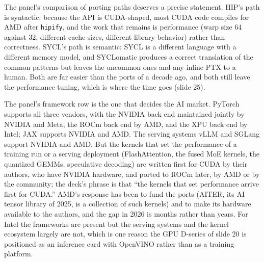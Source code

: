 \documentclass[11pt,letterpaper]{article}
\begin{document}
The panel's comparison of porting paths deserves a precise statement. HIP's path is syntactic: because the API is CUDA-shaped, most CUDA code compiles for AMD after \texttt{hipify}, and the work that remains is performance (warp size 64 against 32, different cache sizes, different library behavior) rather than correctness. SYCL's path is semantic: SYCL is a different language with a different memory model, and SYCLomatic produces a correct translation of the common patterns but leaves the uncommon ones and any inline PTX to a human. Both are far easier than the ports of a decade ago, and both still leave the performance tuning, which is where the time goes (slide 25).

The panel's framework row is the one that decides the AI market. PyTorch supports all three vendors, with the NVIDIA back end maintained jointly by NVIDIA and Meta, the ROCm back end by AMD, and the XPU back end by Intel; JAX supports NVIDIA and AMD. The serving systems vLLM and SGLang support NVIDIA and AMD. But the kernels that set the performance of a training run or a serving deployment (FlashAttention, the fused MoE kernels, the quantized GEMMs, speculative decoding) are written first for CUDA by their authors, who have NVIDIA hardware, and ported to ROCm later, by AMD or by the community; the deck's phrase is that ``the kernels that set performance arrive first for CUDA.'' AMD's response has been to fund the ports (AITER, its AI tensor library of 2025, is a collection of such kernels) and to make its hardware available to the authors, and the gap in 2026 is months rather than years. For Intel the frameworks are present but the serving systems and the kernel ecosystem largely are not, which is one reason the GPU D-series of slide 20 is positioned as an inference card with OpenVINO rather than as a training platform.
\end{document}
